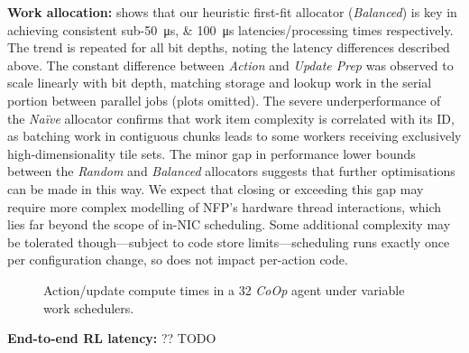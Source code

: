 \documentclass[sigconf,natbib=false]{acmart}
\newcommand{\fakepara}[1]{\noindent\textbf{#1:}}
\newcommand{\Coopfw}{CoOp}
\begin{document}
\fakepara{Work allocation}
 shows that our heuristic first-fit allocator (\emph{Balanced}) is key in achieving consistent sub-\SIlist{50;100}{\micro\second} latencies/processing times respectively.
The trend is repeated for all bit depths, noting the latency differences described above.
The constant difference between \emph{Action} and \emph{Update Prep} was observed to scale linearly with bit depth, matching storage and lookup work in the serial portion between parallel jobs (plots omitted).
The severe underperformance of the \emph{Na\"{i}ve} allocator confirms that work item complexity is correlated with its ID, as batching work in contiguous chunks leads to some workers receiving exclusively high-dimensionality tile sets.
The minor gap in performance lower bounds between the \emph{Random} and \emph{Balanced} allocators suggests that further optimisations can be made in this way.
We expect that closing or exceeding this gap may require more complex modelling of NFP's hardware thread interactions, which lies far beyond the scope of in-NIC scheduling.
Some additional complexity may be tolerated though---subject to code store limits---scheduling runs exactly once per configuration change, so does not impact per-action code.

\begin{figure}
	\caption{Action/update compute times in a \SI{32}{\bit} \emph{\Coopfw{}} agent under variable work schedulers.\label{fig:work-alloc-32}}
\end{figure}

\fakepara{End-to-end RL latency}
?? TODO
\end{document}
